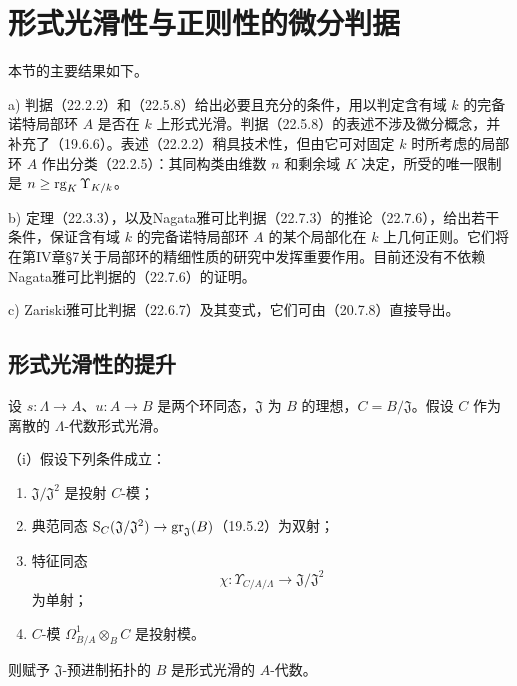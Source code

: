 \setcounter{section}{21}
\section{形式光滑性与正则性的微分判据}
本节的主要结果如下。

\noindent a) 判据（22.2.2）和（22.5.8）给出必要且充分的条件，用以判定含有域 $k$ 的完备诺特局部环 $A$ 是否在 $k$ 上形式光滑。判据（22.5.8）的表述不涉及微分概念，并补充了（19.6.6）。表述（22.2.2）稍具技术性，但由它可对固定 $k$ 时所考虑的局部环 $A$ 作出分类（22.2.5）：其同构类由维数 $n$ 和剩余域 $K$ 决定，所受的唯一限制是 $n\ge\operatorname{rg}_K\Upsilon_{K/k}$。

\noindent b) 定理（22.3.3），以及Nagata雅可比判据（22.7.3）的推论（22.7.6），给出若干条件，保证含有域 $k$ 的完备诺特局部环 $A$ 的某个局部化在 $k$ 上几何正则。它们将在第IV章§7关于局部环的精细性质的研究中发挥重要作用。目前还没有不依赖Nagata雅可比判据的（22.7.6）的证明。

\noindent c) Zariski雅可比判据（22.6.7）及其变式，它们可由（20.7.8）直接导出。

\subsection{形式光滑性的提升}
设 $s:\Lambda\to A$、$u:A\to B$ 是两个环同态，$\mathfrak J$ 为 $B$ 的理想，$C=B/\mathfrak J$。假设 $C$ 作为离散的 $\Lambda$-代数形式光滑。

（i）假设下列条件成立：
\begin{enumerate}[leftmargin=2.5em]
\item[$\alpha)$] $\mathfrak J/\mathfrak J^2$ 是投射 $C$-模；
\item[$\beta)$] 典范同态 $\mathrm S_C(\mathfrak J/\mathfrak J^2)\to\operatorname{gr}_{\mathfrak J}(B)$（19.5.2）为双射；
\item[$\gamma)$] 特征同态
\[
 \chi:\Upsilon_{C/A/\Lambda}\longrightarrow\mathfrak J/\mathfrak J^2
\]
为单射；
\item[$\delta)$] $C$-模 $\Omega^1_{B/A}\otimes_B C$ 是投射模。
\end{enumerate}
则赋予 $\mathfrak J$-预进制拓扑的 $B$ 是形式光滑的 $A$-代数。

